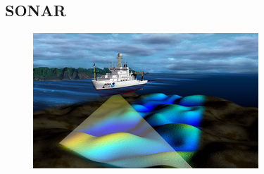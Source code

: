          \subsection*{SONAR}
            \nopagebreak
      \label{m38800*id185202}
\begin{minipage}{.5\textwidth}
      	\begin{figure}[H] %
    \begin{center}

\includegraphics[width=.8\textwidth]{photos/sonar_NOAANationalOceanService_flickr.jpg}
% 

\end{center}
\end{figure}
\end{minipage}
